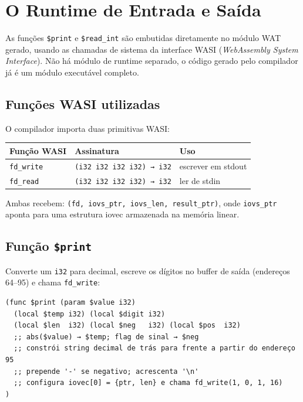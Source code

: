 \section{O Runtime de Entrada e Saída}\label{sec:wat-runtime}

As funções \texttt{\$print} e \texttt{\$read\_int} são embutidas diretamente no
módulo WAT gerado, usando as chamadas de sistema da interface WASI
(\emph{WebAssembly System Interface}).  Não há módulo de runtime separado, o
código gerado pelo compilador já é um módulo executável completo.

\subsection{Funções WASI utilizadas}

O compilador importa duas primitivas WASI:

\begin{center}
  \begin{tabular}{lll}
    \hline
    \textbf{Função WASI} & \textbf{Assinatura} & \textbf{Uso} \\
    \hline
    \texttt{fd\_write} & \texttt{(i32 i32 i32 i32) → i32} & escrever
    em stdout \\
    \texttt{fd\_read}  & \texttt{(i32 i32 i32 i32) → i32} & ler de stdin \\
    \hline
  \end{tabular}
\end{center}

Ambas recebem: \texttt{(fd, iovs\_ptr, iovs\_len, result\_ptr)}, onde
\texttt{iovs\_ptr} aponta para uma estrutura iovec armazenada na memória linear.

\subsection{Função \texttt{\$print}}

Converte um \texttt{i32} para decimal, escreve os dígitos no buffer de saída
(endereços 64–95) e chama \texttt{fd\_write}:

\begin{verbatim}
(func $print (param $value i32)
  (local $temp i32) (local $digit i32)
  (local $len  i32) (local $neg   i32) (local $pos  i32)
  ;; abs($value) → $temp; flag de sinal → $neg
  ;; constrói string decimal de trás para frente a partir do endereço 95
  ;; prepende '-' se negativo; acrescenta '\n'
  ;; configura iovec[0] = {ptr, len} e chama fd_write(1, 0, 1, 16)
)
\end{verbatim}

